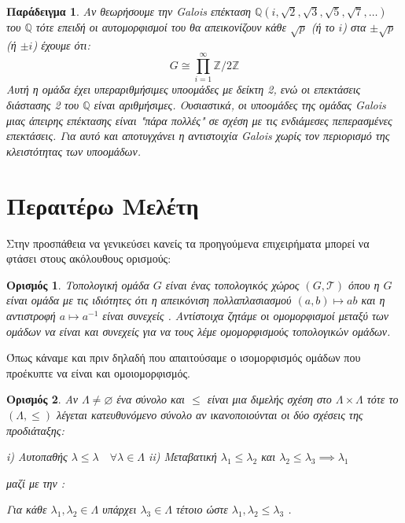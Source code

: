 \documentclass[oneside,a4paper]{article}
\newtheorem{example}{Παράδειγμα}
\newtheorem*{defn}{Ορισμός}
\newcommand {\tl}{\textlatin}
\newcommand{\Z}{\mathbb{Z}}
\newcommand{\Q}{\mathbb{Q}}
\begin{document}
$ $\newline
\begin{example}
	Αν θεωρήσουμε την \tl{Galois} επέκταση $\Q (i, \sqrt 2 , \sqrt 3 , \sqrt 5 , \sqrt 7 , \ldots)$ του $\Q$ τότε επειδή οι αυτομορφισμοί του θα απεικονίζουν κάθε $\sqrt p$ (ή το $i$) στα $ \pm \sqrt p$ (ή $\pm i$) έχουμε ότι:
	$$G \cong \prod\limits_{i=1}^{\infty} \Z / 2 \Z$$
	Αυτή η ομάδα έχει υπεραριθμήσιμες υποομάδες με δείκτη 2, ενώ οι επεκτάσεις διάστασης 2 του $\Q$ είναι αριθμήσιμες. Ουσιαστικά, οι υποομάδες της ομάδας \tl{Galois} μιας άπειρης επέκτασης είναι "πάρα πολλές" σε σχέση με τις ενδιάμεσες πεπερασμένες επεκτάσεις. Για αυτό και αποτυγχάνει η αντιστοιχία \tl{Galois} χωρίς τον περιορισμό της κλειστότητας των υποομάδων.
\end{example}




\pagebreak
\section{Περαιτέρω Μελέτη}


Στην προσπάθεια να γενικεύσει κανείς τα προηγούμενα επιχειρήματα μπορεί να φτάσει στους ακόλουθους ορισμούς:

\begin{defn}Τοπολογική ομάδα $G$ είναι ένας τοπολογικός χώρος $(G,\mathcal T )$ όπου η $G$ είναι ομάδα με τις ιδιότητες ότι η απεικόνιση πολλαπλασιασμού $(a,b) \mapsto ab$ και η αντιστροφή $a \mapsto a^{-1}$ είναι συνεχείς . Αντίστοιχα ζητάμε οι ομομορφισμοί μεταξύ των ομάδων να είναι και συνεχείς για να τους λέμε ομομορφισμούς τοπολογικών ομάδων.
\end{defn}

\noindent Όπως κάναμε και πριν δηλαδή που απαιτούσαμε ο ισομορφισμός ομάδων που προέκυπτε να είναι και ομοιομορφισμός.

\begin{defn} Αν $\Lambda\neq \varnothing$ ένα σύνολο και $\leq$ είναι μια διμελής σχέση στο $\Lambda \times \Lambda$ τότε το $(\Lambda , \leq )$ λέγεται κατευθυνόμενο σύνολο αν ικανοποιούνται οι δύο σχέσεις της προδιάταξης:

i) Αυτοπαθής $\lambda \leq \lambda \quad\forall \lambda \in \Lambda$
ii) Μεταβατική $\lambda_1 \leq \lambda_2$ και  $\lambda_2 \leq \lambda_3 \implies \lambda_1$ 

μαζί με την :

Για κάθε $\lambda_1 , \lambda_2 \in \Lambda$ υπάρχει $\lambda_3 \in \Lambda$ τέτοιο ώστε $\lambda_1, \lambda_2 \leq \lambda_3$ .
\end{defn}
\end{document}

